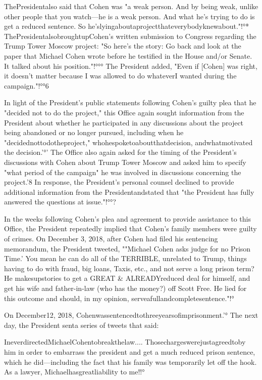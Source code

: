 ThePresidentalso said that Cohen was "a weak person.
And by being weak, unlike other people that you watch—he is a weak person.
And what he's trying to do is get a reduced sentence.
So he'slyingaboutaprojectthateverybodyknewabout."!°*
ThePresidentalsobroughtupCohen's written submission to Congress regarding the Trump Tower Moscow project: "So here's the story: Go back and look at the paper that Michael Cohen wrote before he testified in the House and/or Senate.
It talked about his position."!°°°
The President added, "Even if [Cohen] was right, it doesn't matter because I was allowed to do whateverI wanted during the campaign."!°°6

In light of the President's public statements following Cohen's guilty plea that he "decided not to do the project," this Office again sought information from the President about whether he participated in any discussions about the project being abandoned or no longer pursued, including when he "decidednottodotheproject," whohespoketoaboutthatdecision, andwhatmotivated
the decision.'°'
The Office also again asked for the timing of the President's discussions with Cohen about Trump Tower Moscow and asked him to specify "what period of the campaign" he was involved in discussions concerning the project.'8
In response, the President's personal counsel declined to provide additional information from the Presidentandstated that "the President has fully answered the questions at issue."!°°?

In the weeks following Cohen's plea and agreement to provide assistance to this Office, the President repeatedly implied that Cohen's family members were guilty of crimes.
On December 3, 2018, after Cohen had filed his sentencing memorandum, the President tweeted, ""Michael Cohen asks judge for no Prison Time.'
You mean he can do all of the TERRIBLE, unrelated to Trump, things having to do with fraud, big loans, Taxis, etc., and not serve a long prison term?
He makesupstories to get a GREAT & ALREADYreduced deal for himself, and get his wife and father-in-law (who has the money?) off Scott Free.
He lied for this outcome and should, in my opinion, serveafullandcompletesentence."!°

On December12, 2018, Cohenwassentencedtothreeyearsofimprisonment.'°
The next day, the President senta series of tweets that said:

IneverdirectedMichaelCohentobreakthelaw....
Thosechargeswerejustagreedtoby him in order to embarrass the president and get a much reduced prison sentence, which he did—including the fact that his family was temporarily let off the hook.
As a lawyer, Michaelhasgreatliability to me!!°

